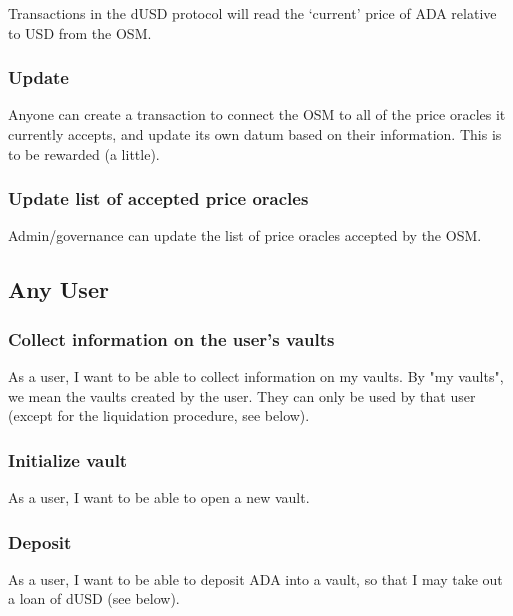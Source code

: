 \documentclass{article} %
\begin{document}
Transactions in the dUSD protocol will read the `current' price of ADA relative
to USD from the OSM.


\subsubsection{Update}

Anyone can create a transaction to connect the OSM to all of the price oracles
it currently accepts, and update its own datum based on their information.
This is to be rewarded (a little).

\subsubsection{Update list of accepted price oracles}

Admin/governance can update the list of price oracles accepted by the OSM.


\subsection{Any User}

\subsubsection{Collect information on the user's vaults}

As a user, I want to be able to collect information on my vaults. By "my
vaults", we mean the vaults created by the user. They can only be used by that
user (except for the liquidation procedure, see below).

\subsubsection{Initialize vault}

As a user, I want to be able to open a new vault.

\subsubsection{Deposit}

As a user, I want to be able to deposit ADA into a vault, so that I may take out
a loan of dUSD (see below).
\end{document}
